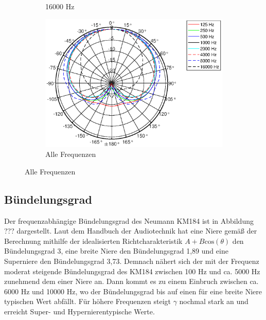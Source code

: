 \begin{figure}[b]
\begin{subfigure}{.33\textwidth}
        \caption{16000 Hz}
        \label{fig:Polar_16000}
    \end{subfigure}
    \begin{subfigure}{.33\textwidth}
        \centering
        \includegraphics[height=\linewidth]{Figures/KM184_allfreqs}
        \caption{Alle Frequenzen}
        \label{fig:Polar_allfreqs}
    \end{subfigure}
\end{figure}

\subsection{Bündelungsgrad}
Der frequenzabhängige Bündelungsgrad des Neumann KM184 ist in Abbildung ??? dargestellt. 
Laut dem Handbuch der Audiotechnik \cite{Weinzierl08} hat eine Niere gemäß der Berechnung mithilfe der idealisierten Richtcharakteristik $A + B \mathrm{cos}(\theta)$ den Bündelungsgrad 3, eine breite Niere den Bündelungsgrad 1,89 und eine Superniere den Bündelungsgrad 3,73.
Demnach nähert sich der mit der Frequenz moderat steigende Bündelungsgrad des KM184 zwischen 100 Hz und ca. 5000 Hz zunehmend dem einer Niere an.
Dann kommt es zu einem Einbruch zwischen ca. 6000 Hz und 10000 Hz, wo der Bündelungsgrad bis auf einen für eine breite Niere typischen Wert abfällt. 
Für höhere Frequenzen steigt $\gamma$ nochmal stark an und erreicht  Super- und Hypernierentypische Werte.


